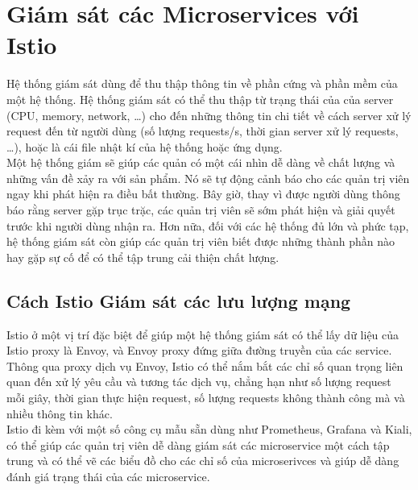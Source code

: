 \documentclass[14pt,a4paper]{book}
\begin{document}
\section{Giám sát các Microservices với Istio}
	{\hspace{0.6cm}Hệ thống giám sát dùng để thu thập thông tin về phần cứng và phần mềm của một hệ thống. Hệ thống giám sát có thể thu thập từ trạng thái của của server (CPU, memory, network, …) cho đến những thông tin chi tiết về cách server xử lý request đến từ người dùng (số lượng requests/s, thời gian server xử lý requests, …), hoặc là cái file nhật kí của hệ thống hoặc ứng dụng.\\
	
	Một hệ thống giám sẽ giúp các quản có một cái nhìn dễ dàng về chất lượng và những vấn đề xảy ra với sản phẩm. Nó sẽ tự động cảnh báo cho các quản trị viên ngay khi phát hiện ra điều bất thường. Bây giờ, thay vì được người dùng thông báo rằng server gặp trục trặc, các quản trị viên sẽ sớm phát hiện và giải quyết trước khi người dùng nhận ra. Hơn nữa, đối với các hệ thống đủ lớn và phức tạp, hệ thống giám sát còn giúp các quản trị viên biết được những thành phần nào hay gặp sự cố để có thể tập trung cải thiện chất lượng.
		\subsection{Cách Istio Giám sát các lưu lượng mạng}
	{\hspace{0.6cm}Istio ở một vị trí đặc biệt để giúp một hệ thống giám sát có thể lấy dữ liệu của Istio proxy là Envoy, và Envoy proxy đứng giữa đường truyền của các service. Thông qua proxy dịch vụ Envoy, Istio có thể nắm bắt các chỉ số quan trọng liên quan đến xử lý yêu cầu và tương tác dịch vụ, chẳng hạn như số lượng request mỗi giây, thời gian thực hiện request, số lượng requests không thành công mà và nhiều thông tin khác.\\		
	
	Istio đi kèm với một số công cụ mẫu sẵn dùng như Prometheus, Grafana và Kiali, có thể giúp các quản trị viên dễ dàng giám sát các microservice một cách tập trung và có thể vẽ các biểu đồ cho các chỉ số của microserivces và giúp dễ dàng đánh giá trạng thái của các microservice.
	
}}
\end{document}
